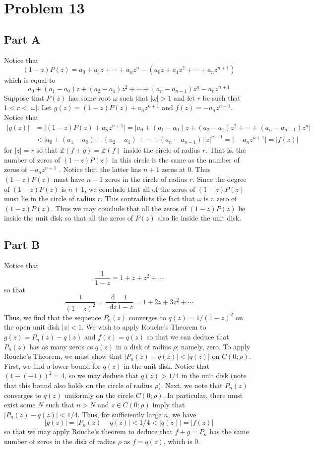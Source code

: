 \documentclass[12pt]{article}
\newcommand{\zz}{\mathbb Z}
\newcommand*\diff{\mathop{}\!\mathrm{d}}
\begin{document}
\section*{Problem 13}
\subsection*{Part A}
Notice that
\[
(1-z)P(z) = a_0 + a_1 z + \cdots + a_nz^n - (a_0z + a_1z^2 + \cdots + a_n z^{n+1}) \] which is equal to 
\[
a_0 + (a_1 - a_0)z + (a_2 - a_1)z^2  + \cdots + (a_n - a_{n-1})z^n - a_nz^{n+1}
\] Suppose that $P(z)$ has some root $\omega$ such that $\vert \omega \vert > 1$ and let $r$ be such that $1 < r < \vert \omega \vert$. Let $g(z) = (1-z)P(z) + a_n z^{n+1}$ and $f(z) = -a_n z^{n+1}$. Notice that
\begin{align*}
\vert g(z) \vert &= \vert (1-z)P(z) + a_n z^{n+1} \vert =  \vert a_0 + (a_1 - a_0)z + (a_2 - a_1)z^2  + \cdots + (a_n - a_{n-1})z^n \vert \\
& <  \vert a_0 + (a_1 - a_0) + (a_2 - a_1) + \cdots + (a_n - a_{n-1}) \vert \vert z \vert^{n+1} = \vert -a_n z^{n+1} \vert = \vert f(z) \vert
\end{align*} for $\vert z \vert = r$ so that $\zz(f+g) = \zz(f)$ inside the circle of radius $r$. That is, the number of zeros of $(1-z)P(z)$ in this circle is the same as the number of zeros of $-a_nz^{n+1}$ . Notice that the latter has $n+1$ zeros at $0$. Thus $(1-z)P(z)$ must have $n+1$ zeros in the circle of radius $r$. Since the degree of $(1-z)P(z)$ is $n+1$, we conclude that all of the zeros of $(1-z)P(z)$ must lie in the circle of radius $r$. This contradicts the fact that $\omega$ is a zero of $(1-z)P(z)$. Thus we may conclude that all the zeros of $(1-z)P(z)$ lie inside the unit disk so that all the zeros of $P(z)$ also lie inside the unit disk.
\subsection*{Part B}
Notice that
\[
\frac{1}{1-z} = 1 + z + z^2 +\cdots 
\] so that
\[
\frac{1}{(1-z)^2} = \frac{\diff}{\diff z} \frac{1}{1-z} = 1 + 2z + 3z^2 + \cdots
\] 
Thus, we find that the sequence $P_n(z)$ converges to $q(z) = 1/(1-z)^2$ on the open unit disk $\vert z \vert < 1$. We wish to apply Rouche's Theorem to $g(z) = P_n(z) - q(z)$ and $f(z) = q(z)$ so that we can deduce that $P_n(z)$ has as many zeros as $q(z)$ in a disk of radius $\rho$; namely, zero. To apply Rouche's Theorem, we must show that $\vert P_n(z) - q(z) \vert < \vert q(z) \vert$ on $C(0;\rho)$. First, we find a lower bound for $q(z)$ in the unit disk. Notice that $(1-(-1))^2 = 4$, so we may deduce that $q(z) > 1/4$ in the unit disk (note that this bound also holds on the circle of radius $\rho$). Next, we note that $P_n(z)$ converges to $q(z)$ uniformly on the circle $C(0;\rho)$. In particular, there must exist some $N$ such that $n > N$ and $z \in C(0;\rho)$ imply that $\vert P_n(z) - q(z) \vert < 1/4$. Thus, for sufficiently large $n$, we have
\[
\vert g(z) \vert = \vert P_n(z) - q(z) \vert < 1/4 < \vert q(z) \vert = \vert f(z) \vert 
\]  so that we may apply Rouche's theorem to deduce that $f+g = P_n$ has the same number of zeros in the disk of radius $\rho$ as $f = q(z)$, which is $0$.
\newpage
\end{document}

